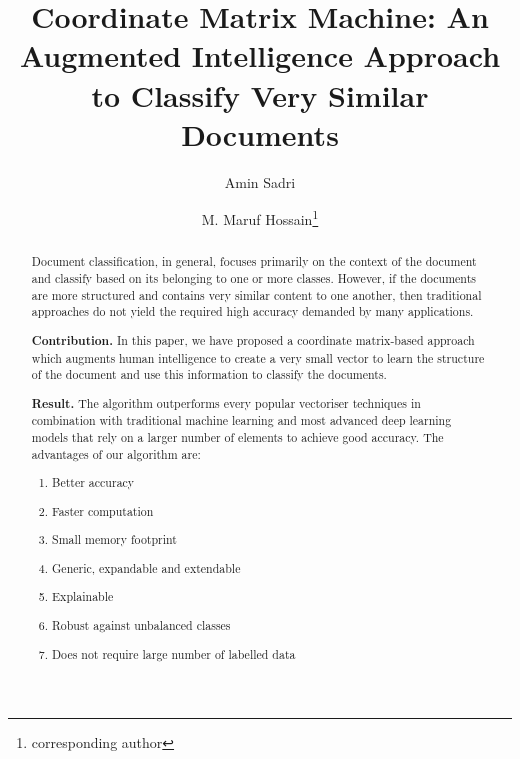 \documentclass[runningheads]{llncs}
\begin{document}
%
\title{Coordinate Matrix Machine: An Augmented Intelligence Approach to Classify Very Similar Documents}
%
%
\author{Amin Sadri \and
M. Maruf Hossain\thanks{corresponding author}}
%
%
%
\maketitle              %
%
\begin{abstract}
Document classification, in general, focuses primarily on the context of the document and classify based on its belonging to one or more classes. However, if the documents are more structured and contains very similar content to one another, then traditional approaches do not yield the required high accuracy demanded by many applications.

\textbf{Contribution.} In this paper, we have proposed a coordinate matrix-based approach which augments human intelligence to create a very small vector to learn the structure of the document and use this information to classify the documents.

\textbf{Result.} The algorithm outperforms every popular vectoriser techniques in combination with traditional machine learning and most advanced deep learning models that rely on a larger number of elements to achieve good accuracy. The advantages of our algorithm are:
\begin{enumerate}
\item Better accuracy
\item Faster computation
\item Small memory footprint
\item Generic, expandable and extendable
\item Explainable
\item Robust against unbalanced classes
\item Does not require large number of labelled data
\end{enumerate}

\end{abstract}
%
%
%
\end{document}
